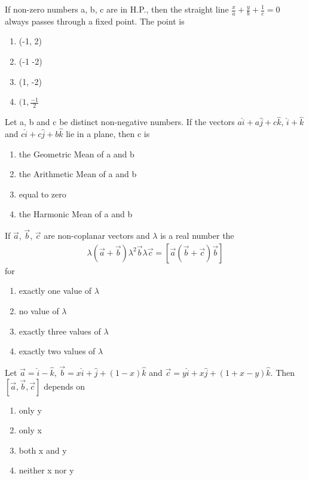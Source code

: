 \item If non-zero numbers a, b, c are in H.P., then the straight line $\frac{x}{a} + \frac{y}{b} + \frac{1}{c} = 0$ always passes through a fixed point. The point is
\begin{enumerate}
\item (-1, 2)
\item (-1 -2)
\item (1, -2)
\item $(1, \frac{-1}{2}$
\end{enumerate}

\item Let a, b and c be distinct non-negative numbers. If the vectors $a\hat{i} + a\hat{j} + c\hat{k}$, $\hat{i} + \hat{k}$ and $c\hat{i} + c\hat{j} + b\hat{k}$ lie in a plane, then c is
\begin{enumerate}
\item the Geometric Mean of a and b
\item the Arithmetic Mean of a and b
\item equal to zero
\item the Harmonic Mean of a and b
\end{enumerate}

\item If $\overrightarrow{a}$, $\overrightarrow{b}$, $\overrightarrow{c}$ are non-coplanar vectors and $\lambda$ is a real number the 
\begin{align*}
\lambda(\overrightarrow{a} + \overrightarrow{b})\lambda^{2}\overrightarrow{b}\lambda\overrightarrow{c} = [\overrightarrow{a}  (\overrightarrow{b} + \overrightarrow{c}) \overrightarrow{b}]
\end{align*}
for
\begin{enumerate}
\item exactly one value of $\lambda$
\item no value of $\lambda$
\item exactly three values of $\lambda$
\item exactly two values of $\lambda$
\end{enumerate}

\item Let $\overrightarrow{a} = \hat{i} - \hat{k}$, $\overrightarrow{b} = x\hat{i} + \hat{j} + (1-x)\hat{k}$ and 
$\overrightarrow{c} = y\hat{i} + x\hat{j} + (1 + x - y)\hat{k}$. Then $[\overrightarrow{a}, \overrightarrow{b},\overrightarrow{c}]$ depends on
\begin{enumerate}
\item only y
\item only x
\item both x and y
\item neither x nor y
\end{enumerate}

